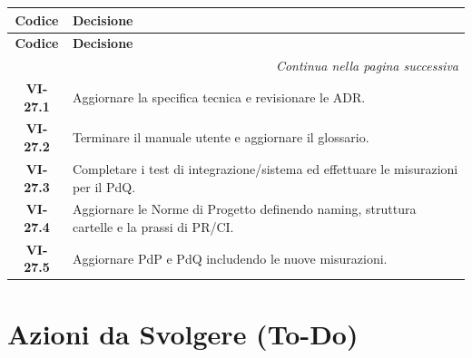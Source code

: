\vspace{-0.3cm}

\noindent

\begin{longtable}{c p{12cm}}

\toprule

\textbf{Codice} & \textbf{Decisione} \\

\midrule

\endfirsthead


\toprule

\textbf{Codice} & \textbf{Decisione} \\

\midrule

\endhead


\midrule

\multicolumn{2}{r}{\textit{Continua nella pagina successiva}} \\

\midrule

\endfoot


\bottomrule

\endlastfoot


\textbf{VI-27.1} & {Aggiornare la specifica tecnica e revisionare le ADR.} \\

\textbf{VI-27.2} & {Terminare il manuale utente e aggiornare il glossario.} \\

\textbf{VI-27.3} & {Completare i test di integrazione/sistema ed effettuare le misurazioni per il PdQ.} \\

\textbf{VI-27.4} & {Aggiornare le Norme di Progetto definendo naming, struttura cartelle e la prassi di PR/CI.} \\

\textbf{VI-27.5} & {Aggiornare PdP e PdQ includendo le nuove misurazioni.} \\

\end{longtable}



\section{Azioni da Svolgere (To-Do)}


\renewcommand{\arraystretch}{1.3}

